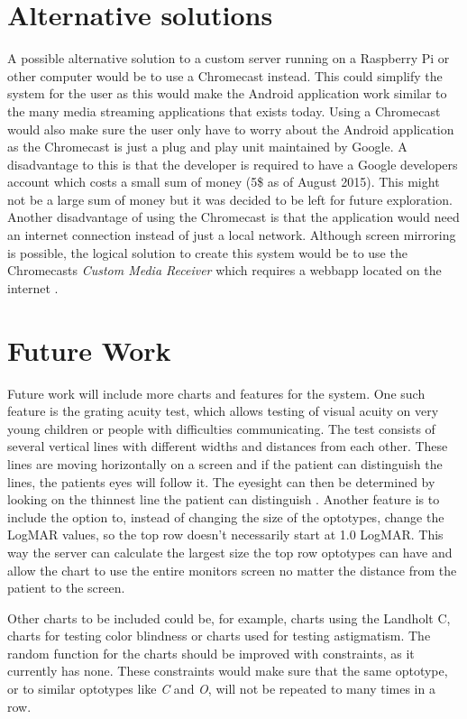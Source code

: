 \documentclass[12pt,a4paper,notitlepage]{report}
\begin{document}
\section{Alternative solutions}
A possible alternative solution to a custom server running on a Raspberry Pi or other computer would be to use a Chromecast instead. This could simplify the system for the user as this would make the Android application work similar to the many media streaming applications that exists today. Using a Chromecast would also make sure the user only have to worry about the Android application as the Chromecast is just a plug and play unit maintained by Google. A disadvantage to this is that the developer is required to have a Google developers account which costs a small sum of money (5\$ as of August 2015). This might not be a large sum of money but it was decided to be left for future exploration. Another disadvantage of using the Chromecast is that the application would need an internet connection instead of just a local network. Although screen mirroring is possible, the logical solution to create this system would be to use the Chromecasts \textit{Custom Media Receiver} which requires a webbapp located on the internet \cite{android_receiver_app}.

\section{Future Work}
Future work will include more charts and features for the system. One such feature is the grating acuity test, which allows testing of visual acuity on very young children or people with difficulties communicating. The test consists of several vertical lines with different widths and distances from each other. These lines are moving horizontally on a screen and if the patient can distinguish the lines, the patients eyes will follow it. The eyesight can then be determined by looking on the thinnest line the patient can distinguish \cite{PGSoderbergOral}. Another feature is to include the option to, instead of changing the size of the optotypes, change the LogMAR values, so the top row doesn't necessarily start at 1.0 LogMAR. This way the server can calculate the largest size the top row optotypes can have and allow the chart to use the entire monitors screen no matter the distance from the patient to the screen.

Other charts to be included could be, for example, charts using the Landholt C, charts for testing color blindness or charts used for testing astigmatism. The random function for the charts should be improved with constraints, as it currently has none. These constraints would make sure that the same optotype, or to similar optotypes like \textit{C} and \textit{O}, will not be repeated to many times in a row.
\end{document}
